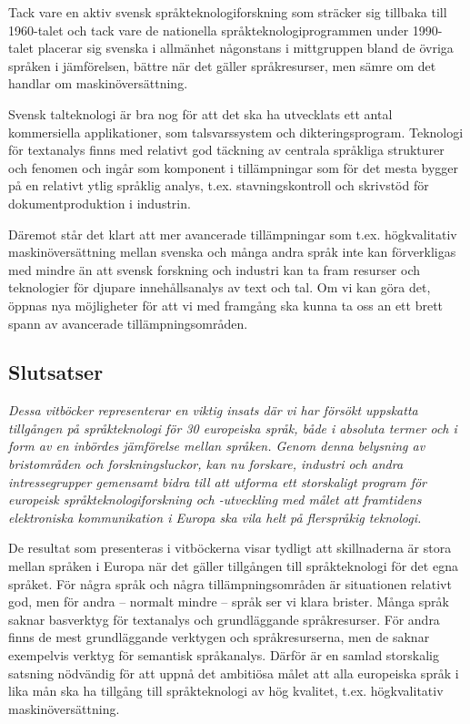 \begin{multicols}{2}
Tack vare en aktiv svensk språkteknologiforskning som sträcker sig
tillbaka till 1960-talet och tack vare de nationella
språkteknologiprogrammen under 1990-talet placerar sig svenska i
allmänhet någonstans i mittgruppen bland de övriga språken i
jäm\-fö\-rel\-sen, bättre när det gäller språkresurser, men sämre om det
handlar om maskinöversättning.

Svensk talteknologi är bra nog för att det ska ha utvecklats ett antal
kommersiella applikationer, som talsvarssystem och
dikteringsprogram. Teknologi för textanalys finns med relativt god
täckning av centrala språkliga strukturer och fenomen och ingår som
komponent i tillämpningar som för det mesta bygger på en relativt
ytlig språklig analys, t.ex. stavningskontroll och skrivstöd för
dokumentproduktion i industrin.

Däremot står det klart att mer avancerade tillämpningar som t.ex.
högkvalitativ maskinöversättning mellan svenska och många andra språk
inte kan förverkligas med mindre än att svensk forskning och industri
kan ta fram resurser och teknologier för djupare innehållsanalys av
text och tal. Om vi kan göra det, öppnas nya möjligheter för att vi
med framgång ska kunna ta oss an ett brett spann av avancerade
tillämpningsområden.


\subsection{Slutsatser}

\emph{Dessa vitböcker representerar en viktig insats där vi har
  försökt uppskatta tillgången på språkteknologi för 30 europeiska
  språk, både i absoluta termer och i form av en inbördes jäm\-förelse
  mellan språken. Genom denna belys\-ning av brist\-områden och
  forsknings\-luckor, kan nu forskare, industri och andra
  intresse\-grupper gemen\-samt bidra till att utforma ett
  stor\-skaligt program för europeisk språk\-tekno\-logi\-forsk\-ning
  och -utveckling med målet att framtidens elektroniska kommunikation
  i Europa ska vila helt på fler\-språkig teknologi.}

De resultat som presenteras i vitböckerna visar tydligt att
skillnaderna är stora mellan språken i Europa när det gäller
tillgången till språkteknologi för det egna språket. För några språk
och några tillämpningsområden är situationen relativt god, men för
andra -- normalt mindre -- språk ser vi klara brister. Många språk
saknar basverktyg för textanalys och grundläggande språkresurser. För
andra finns de mest grundläggande verktygen och språkresurserna, men
de saknar exempelvis verktyg för semantisk språkanalys. Därför är en
samlad storskalig satsning nödvändig för att uppnå det ambitiösa målet
att alla europeiska språk i lika mån ska ha tillgång till
språkteknologi av hög kvalitet, t.ex. högkvalitativ
maskinöversättning.


\end{multicols}
